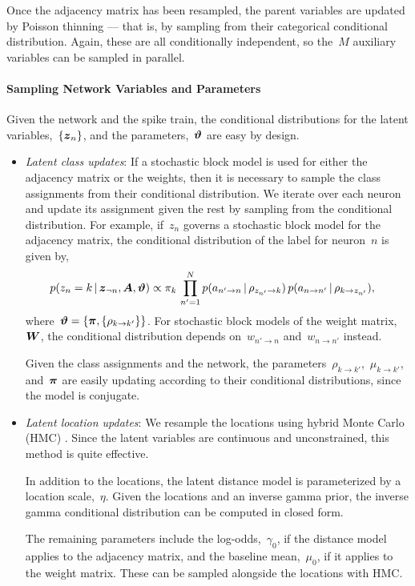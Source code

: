 Once the adjacency matrix has been resampled, the parent variables
are updated by Poisson thinning --- that is, by sampling from their
categorical conditional distribution. Again, these are all conditionally
independent, so the~$M$ auxiliary variables can be sampled in parallel.

\paragraph{Sampling Network Variables and Parameters}
Given the network and the spike train, the conditional distributions 
for the latent variables,~$\{\boldsymbol{z}_n\}$, and the parameters,~$\boldsymbol{\vartheta}$ 
are easy by design.

\begin{itemize}
  \item \textit{Latent class updates}:
    If a stochastic block model is used for either the adjacency matrix
    or the weights, then it is necessary to sample the class assignments
    from their conditional distribution. We iterate over each neuron and
    update its assignment given the rest by sampling from the conditional
    distribution. For example, if~$z_n$ governs a stochastic block model
    for the adjacency matrix, the conditional distribution of the label
    for neuron~$n$ is given by,
    \begin{align}
      p(z_n = k \,|\, \boldsymbol{z}_{\neg n}, \boldsymbol{A}, \boldsymbol{\vartheta})
      &\propto \pi_{k} \,
      \prod_{n'=1}^N p(a_{n' \to n} \,|\, \rho_{z_{n'} \to k}) \,
                    p(a_{n \to n'} \,|\, \rho_{k \to z_{n'}}),
    \end{align}
    where~$\boldsymbol{\vartheta} = \{\boldsymbol{\pi}, \{\rho_{k \to k'}\} \}$. For stochastic block
    models of the weight matrix,~$\boldsymbol{W}$, the conditional distribution
    depends on~$w_{n' \to n}$ and~$w_{n \to n'}$ instead.

    Given the class assignments and the network, the
    parameters~$\rho_{k \to k'}$,~$\mu_{k \to k'}$, and~$\boldsymbol{\pi}$ are easily updating
    according to their conditional distributions, since the model is
    conjugate.
    
  \item \textit{Latent location updates}:
    We resample the locations using hybrid Monte Carlo (HMC) \citep{Neal10}.
    Since the latent variables are continuous and unconstrained,
    this method is quite effective.

    In addition to the locations, the latent distance model is parameterized
    by a location scale,~$\eta$. Given the locations and an inverse gamma
    prior, the inverse gamma conditional distribution can be computed in
    closed form.
    
    The remaining parameters include the log-odds,~$\gamma_0$, if the
    distance model applies to the adjacency matrix, and the baseline
    mean,~$\mu_0$, if it applies to the weight matrix. These can be
    sampled alongside the locations with HMC.  
\end{itemize}

